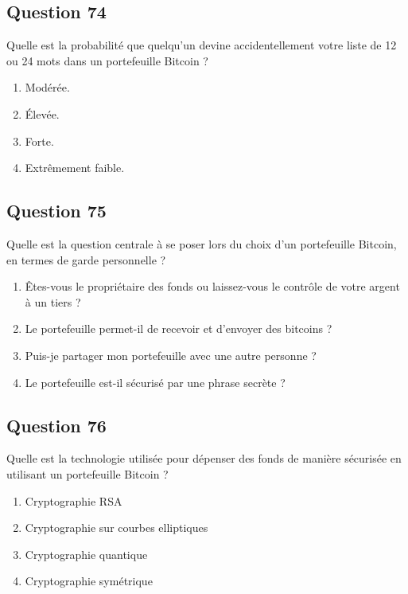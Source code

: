 \documentclass[12pt,a4paper]{article}
\begin{document}
\bigskip


\subsection*{Question 74}
Quelle est la probabilité que quelqu'un devine accidentellement votre liste de 12 ou 24 mots dans un portefeuille Bitcoin ?

\begin{enumerate}[label=\Alph*., leftmargin=*]
\item Modérée.
\item Élevée.
\item Forte.
\item Extrêmement faible.
\end{enumerate}

\bigskip


\subsection*{Question 75}
Quelle est la question centrale à se poser lors du choix d'un portefeuille Bitcoin, en termes de garde personnelle ?

\begin{enumerate}[label=\Alph*., leftmargin=*]
\item Êtes-vous le propriétaire des fonds ou laissez-vous le contrôle de votre argent à un tiers ?
\item Le portefeuille permet-il de recevoir et d'envoyer des bitcoins ?
\item Puis-je partager mon portefeuille avec une autre personne ?
\item Le portefeuille est-il sécurisé par une phrase secrète ?
\end{enumerate}

\bigskip


\subsection*{Question 76}
Quelle est la technologie utilisée pour dépenser des fonds de manière sécurisée en utilisant un portefeuille Bitcoin ?

\begin{enumerate}[label=\Alph*., leftmargin=*]
\item Cryptographie RSA
\item Cryptographie sur courbes elliptiques
\item Cryptographie quantique
\item Cryptographie symétrique
\end{enumerate}
\end{document}
